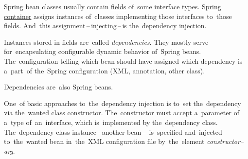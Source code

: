 \label{dependencyinjection}
Spring bean classes usually contain \hyperref[variablefieldproperty]{fields} of~some interface types. \hyperref[springcontainrer]{Spring container} assigns instances of~classes implementing those interfaces to~those fields. And~this assignment\,--\,injecting\,--\,is the~dependency injection.

Instances stored in fields are~called \textit{dependencies}. They mostly serve for~encapsulating configurable dynamic behavior of~Spring beans. The~configuration telling which bean should have assigned which dependency is a~part~of the~Spring configuration (XML, annotation, other class).

\note Dependencies are~also Spring beans.

\label{constructorinjection}
One~of basic approaches to~the~dependency injection is to~set the~dependency via the~wanted class constructor. The~constructor must accept a~parameter of a~type of~an~interface, which is~implemented by the~dependency class. The~dependency class instance\,--\,another bean\,--\, is~specified and~injected to~the~wanted bean in~the~XML configuration file by~the~element \textit{constructor--arg}.

